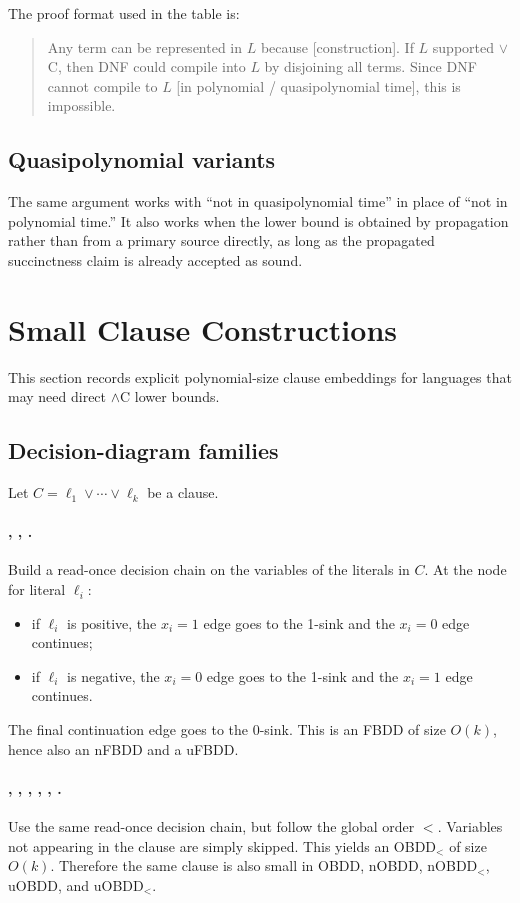 \documentclass[11pt]{article}
\begin{document}
The proof format used in the table is:
\begin{quote}
Any term can be represented in $L$ because [construction]. If $L$ supported $\lor$C, then DNF could compile into $L$ by disjoining all terms. Since DNF cannot compile to $L$ [in polynomial / quasipolynomial time], this is impossible.
\end{quote}

\subsection{Quasipolynomial variants}
The same argument works with ``not in quasipolynomial time'' in place of ``not in polynomial time.''
It also works when the lower bound is obtained by propagation rather than from a primary source directly, as long as the propagated succinctness claim is already accepted as sound.

\section{Small Clause Constructions}
This section records explicit polynomial-size clause embeddings for languages that may need direct $\land$C lower bounds.

\subsection{Decision-diagram families}
Let $C = \ell_1 \lor \cdots \lor \ell_k$ be a clause.

\paragraph{, , .}
Build a read-once decision chain on the variables of the literals in $C$.
At the node for literal $\ell_i$:
\begin{itemize}[noitemsep]
  \item if $\ell_i$ is positive, the $x_i=1$ edge goes to the 1-sink and the $x_i=0$ edge continues;
  \item if $\ell_i$ is negative, the $x_i=0$ edge goes to the 1-sink and the $x_i=1$ edge continues.
\end{itemize}
The final continuation edge goes to the 0-sink.
This is an FBDD of size $O(k)$, hence also an nFBDD and a uFBDD.

\paragraph{, , , , , .}
Use the same read-once decision chain, but follow the global order $<$.
Variables not appearing in the clause are simply skipped.
This yields an OBDD$_<$ of size $O(k)$.
Therefore the same clause is also small in OBDD, nOBDD, nOBDD$_<$, uOBDD, and uOBDD$_<$.
\end{document}
